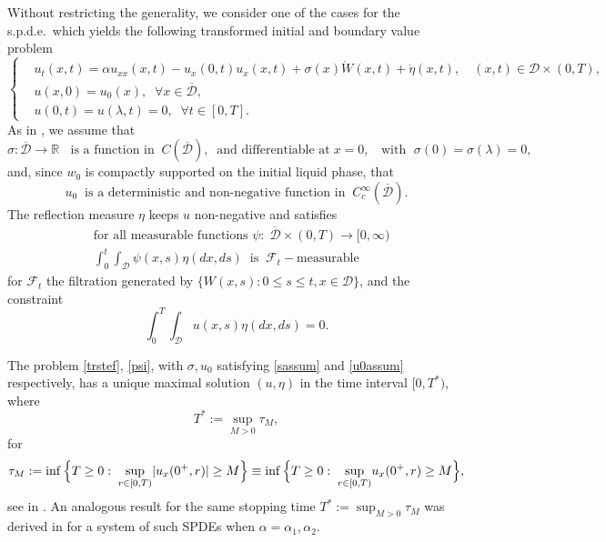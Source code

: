 \documentclass[reqno]{amsart}
\numberwithin{equation}{section}
\newcommand{\mR}{\mathbb{R}}
\newcommand{\cd}{\mathcal{D}}
\newcommand{\cf}{\mathcal{F}}
\begin{document}
Without restricting the generality, we consider one of the cases for the s.p.d.e.\ which yields the following transformed initial and boundary value problem
\begin{equation}\label{trstef}
\left\{
\begin{aligned}
&u_t(x,t)= \alpha
u_{xx}(x,t)-u_x(0,t)u_x(x,t)+\sigma(x)\dot{W}(x,t)+\dot{\eta}(x,t),\quad
(x, t)\in\cd\times(0,T),\\
& u(x,0) =
u_0(x),\;\;\forall x\in\overline{\cd},\\
&u(0,t) = u(\lambda,t) = 0,\;\;\forall t\in[0,T].
\end{aligned}
\right.
\end{equation}
As in \cite{AFK2}, we assume that
\begin{equation}\label{sassum}
\sigma:\overline{\cd}\rightarrow\mR\;\;\mbox{ is a function
in}\;\;C(\overline{\cd}),\;\;\mbox{and differentiable
at}\; x=0,\;\; \mbox{ with }\;\sigma(0)=\sigma(\lambda)=0,
\end{equation}
and, since $w_0$ is compactly supported on the initial liquid
phase, that
\begin{equation}\label{u0assum}
u_0\;\;\mbox{is a deterministic and non-negative function in}\;\;
C^\infty_c(\overline{\mathcal{D}}).
\end{equation}
The reflection measure $\eta$ keeps $u$ non-negative and satisfies
\begin{equation}\label{psi}
\begin{split}
&\mbox{for all}\mbox{ measurable functions }
\psi:\;\overline{\mathcal{D}}\times (0,T)\rightarrow [0,\infty)\\
&\int_0^t\int_{\mathcal{D}}\psi(x,s)\eta(dx,ds)\;\;\mbox{is}\;\;\mathcal{F}_t-\mbox{measurable}
\end{split}
\end{equation}
for $\cf_{t}$ the filtration generated by $\{W(x,s): 0 \leq s\leq
t, x\in\cd\}$, and the constraint
\begin{equation}\label{refl}
\int_0^T\int_{\mathcal{D}} u(x,s)\eta(dx,ds)=0.
\end{equation}

The problem \eqref{trstef}, \eqref{psi}, with $\sigma, u_0 $ satisfying \eqref{sassum} and \eqref{u0assum} respectively, has a unique maximal solution $(u,\eta)$ in the time interval $[0,T^*)$, where
\begin{equation}\label{stime}
T^*:=\displaystyle{\sup_{M>0}}\tau_M,
\end{equation}
for
$$\tau_M:=\inf\Big{\{}T\geq
0:\;\displaystyle{\sup_{r\in[0,T)}}|u_x(0^+,r)|\geq M\Big{\}}
\equiv\inf\Big{\{}T\geq 0:\;\displaystyle{\sup_{r\in[0,T)}}
u_x(0^+,r)\geq M\Big{\}} ,
$$
see in \cite{AFK2}. An analogous result for the same stopping time $T^*:=\sup_{M>0}\tau_M$ was derived in \cite{BH} for a system of such SPDEs when $\alpha=\alpha_1,\alpha_2$.
\end{document}
